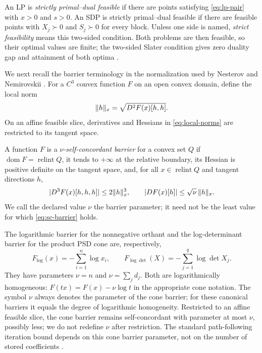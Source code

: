 \begin{definition}
\label{def:strict-feasibility}
An LP is \emph{strictly primal--dual feasible} if there are points satisfying
\eqref{eq:lp-pair} with $x>0$ and $s>0$.  An SDP is strictly primal--dual
feasible if there are feasible points with $X_j\succ0$ and $S_j\succ0$ for
every block.  Unless one side is named, \emph{strict feasibility} means this
two-sided condition.  Both problems are then feasible, so their optimal values
are finite; the two-sided Slater condition gives zero duality gap and
attainment of both optima \cite{boyd2004-convex-optimization}.
\end{definition}

We next recall the barrier terminology in the normalization used by
Nesterov and Nemirovskii \cite{nesterov1994-interior-point-polynomial-algorithms-convex}.
For a $C^3$ convex function $F$ on an open convex domain, define the local
norm
\begin{equation}
 \lVert h\rVert_x=\sqrt{D^2F(x)[h,h]}.
 \label{eq:local-norms}
\end{equation}
On an affine feasible slice, derivatives and Hessians in
\eqref{eq:local-norms} are restricted to its tangent space.

\begin{definition}
\label{def:self-concordant-barrier}
A function $F$ is a \emph{$\nu$-self-concordant barrier} for a convex set
$Q$ if $\operatorname{dom}F=\operatorname{relint}Q$, it tends to $+\infty$
at the relative boundary, its Hessian is positive definite on the tangent
space, and, for all $x\in\operatorname{relint}Q$ and tangent directions $h$,
\begin{equation}
 |D^3F(x)[h,h,h]|\leq2\lVert h\rVert_x^3,
 \qquad
 |DF(x)[h]|\leq\sqrt\nu\,\lVert h\rVert_x.
 \label{eq:sc-barrier}
\end{equation}
We call the declared value $\nu$ the barrier parameter; it need not be the
least value for which \eqref{eq:sc-barrier} holds.
\end{definition}

The logarithmic barrier for the nonnegative orthant and the log-determinant
barrier for the product PSD cone are, respectively,
\begin{equation}
 F_{\log}(x)=-\sum_{i=1}^n\log x_i,
 \qquad
 F_{\log\det}(X)=-\sum_{j=1}^q\log\det X_j.
 \label{eq:canonical-barriers}
\end{equation}
They have parameters $\nu=n$ and $\nu=\sum_jd_j$.  Both are logarithmically
homogeneous: $F(tx)=F(x)-\nu\log t$ in the appropriate cone notation.  The
symbol $\nu$ always denotes the parameter of the cone barrier; for these
canonical barriers it equals the degree of logarithmic homogeneity.  Restricted
to an affine feasible slice, the cone barrier remains self-concordant with
parameter at most $\nu$, possibly less; we do not redefine $\nu$ after
restriction.  The standard path-following iteration bound depends on this cone
barrier parameter, not on the number of stored coefficients
\cite{nesterov1994-interior-point-polynomial-algorithms-convex}.

